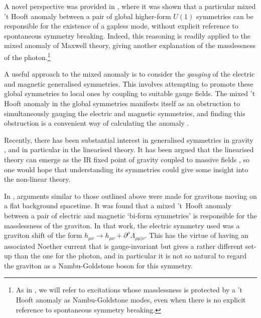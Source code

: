 A novel perspective was provided in \cite{Delacretaz:2019brr}, where it was shown that a particular mixed 't Hooft anomaly between a pair of global higher-form $U(1)$ symmetries can be responsible for the existence of a gapless mode, without explicit reference to spontaneous symmetry breaking. Indeed, this reasoning is readily applied to the mixed anomaly of Maxwell theory, giving another explanation of the masslessness of the photon.\footnote{As in \cite{Delacretaz:2019brr, Hinterbichler2023GravitySymmetries}, we will refer to excitations whose masslessness is protected by a 't Hooft anomaly as Nambu-Goldstone modes, even when there is no explicit reference to spontaneous symmetry breaking.}

A useful approach to the mixed anomaly is to consider the \emph{gauging} of the electric and magnetic generalised symmetries. This involves attempting to promote these global symmetries to local ones by coupling to suitable gauge fields.
The mixed 't Hooft anomaly in the global symmetries manifests itself as an obstruction to simultaneously gauging the electric and magnetic symmetries, and finding this obstruction is a convenient way of calculating the anomaly \cite{Harvey:2005it}.

Recently, there has been substantial interest in generalised symmetries in gravity \cite{Hinterbichler2023GravitySymmetries, Benedetti2022GeneralizedGraviton, Benedetti2023GeneralizedGravitons, BenedettiNoether, Cheung:2024ypq, Gomez-Fayren2023CovariantRelativity, Hull:2024mfb, Hull:2024xgo}, and in particular in the linearised theory.
It has been argued that the linearised theory can emerge as the IR fixed point of gravity coupled to massive fields \cite{Farnsworth:2021zgj}, so one would hope that understanding its symmetries could give some insight into the non-linear theory.

In \cite{Hinterbichler2023GravitySymmetries}, arguments similar to those outlined above were made for gravitons moving on a flat background spacetime.
It was found that a mixed 't~Hooft anomaly between a pair of electric and magnetic `bi-form symmetries' is responsible for the masslessness of the graviton. 
In that work, the electric symmetry used was a graviton shift of the form $h_{\mu\nu} \to h_{\mu\nu} + \partial^\rho \Lambda_{\rho\mu|\nu}$.
This has the virtue of having an associated Noether current that is gauge-invariant but gives a rather different set-up than the one for the photon, and in particular it is not so natural to regard the graviton as a Nambu-Goldstone boson for this symmetry. 

